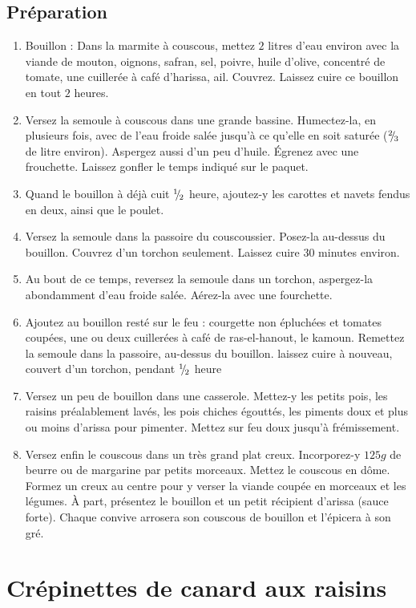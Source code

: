\subsection*{Préparation}
\begin{enumerate}
\item Bouillon : Dans la marmite à couscous, mettez $2$ litres d'eau environ avec la viande de mouton, oignons, safran, sel, poivre, huile d'olive, concentré de tomate, une cuillerée à café d'harissa, ail. Couvrez. Laissez cuire ce bouillon en tout $2$ heures.
\item Versez la semoule à couscous dans une grande bassine. Humectez-la, en plusieurs fois, avec de l'eau froide salée jusqu'à ce qu'elle en soit saturée (${{}^{2\!\!}/ _{\!3}}$ de litre environ). Aspergez aussi d'un peu d'huile. Égrenez avec une frouchette. Laissez gonfler le temps indiqué sur le paquet.
\item Quand le bouillon à déjà cuit ${{}^{1\!\!}/ _{\!2}}$ heure, ajoutez-y les carottes et navets fendus en deux, ainsi que le poulet.
\item Versez la semoule dans la passoire du couscoussier. Posez-la au-dessus du bouillon. Couvrez d'un torchon seulement. Laissez cuire $30$ minutes environ.
\item Au bout de ce temps, reversez la semoule dans un torchon, aspergez-la abondamment d'eau froide salée. Aérez-la avec une fourchette.
\item Ajoutez au bouillon resté sur le feu : courgette non épluchées et tomates coupées, une ou deux cuillerées à café de ras-el-hanout, le kamoun. Remettez la semoule dans la passoire, au-dessus du bouillon. laissez cuire à nouveau, couvert d'un torchon, pendant ${{}^{1\!\!}/ _{\!2}}$ heure
\item Versez un peu de bouillon dans une casserole. Mettez-y les petits pois, les raisins préalablement lavés, les pois chiches égouttés, les piments doux et plus ou moins d'arissa pour pimenter. Mettez sur feu doux jusqu'à frémissement.
\item Versez enfin le couscous dans un très grand plat creux. Incorporez-y $125\unit{g}$ de beurre ou de margarine par petits morceaux. Mettez le couscous en dôme. Formez un creux au centre pour y verser la viande coupée en morceaux et les légumes. À part, présentez le bouillon et un petit récipient d'arissa (sauce forte). Chaque convive arrosera son couscous de bouillon et l'épicera à son gré.
\end{enumerate}

\newpage
\section{Crépinettes de canard aux raisins}
